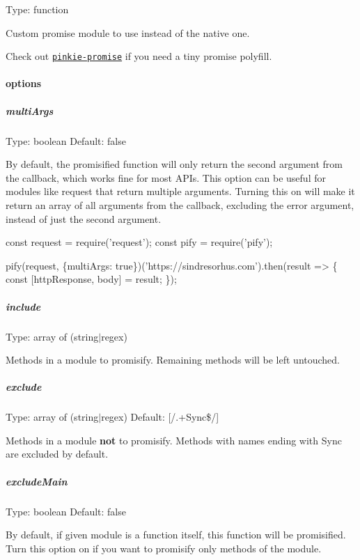 Type\+: {\ttfamily function}

Custom promise module to use instead of the native one.

Check out \href{https://github.com/floatdrop/pinkie-promise}{\tt {\ttfamily pinkie-\/promise}} if you need a tiny promise polyfill.

\paragraph*{options}

\subparagraph*{multi\+Args}

Type\+: {\ttfamily boolean} Default\+: {\ttfamily false}

By default, the promisified function will only return the second argument from the callback, which works fine for most A\+P\+Is. This option can be useful for modules like {\ttfamily request} that return multiple arguments. Turning this on will make it return an array of all arguments from the callback, excluding the error argument, instead of just the second argument.


\begin{DoxyCode}
const request = require('request');
const pify = require('pify');

pify(request, \{multiArgs: true\})('https://sindresorhus.com').then(result => \{
    const [httpResponse, body] = result;
\});
\end{DoxyCode}


\subparagraph*{include}

Type\+: {\ttfamily array} of ({\ttfamily string}$\vert${\ttfamily regex})

Methods in a module to promisify. Remaining methods will be left untouched.

\subparagraph*{exclude}

Type\+: {\ttfamily array} of ({\ttfamily string}$\vert${\ttfamily regex}) Default\+: {\ttfamily \mbox{[}/.+\+Sync\$/\mbox{]}}

Methods in a module {\bfseries not} to promisify. Methods with names ending with {\ttfamily \textquotesingle{}Sync\textquotesingle{}} are excluded by default.

\subparagraph*{exclude\+Main}

Type\+: {\ttfamily boolean} Default\+: {\ttfamily false}

By default, if given module is a function itself, this function will be promisified. Turn this option on if you want to promisify only methods of the module.


